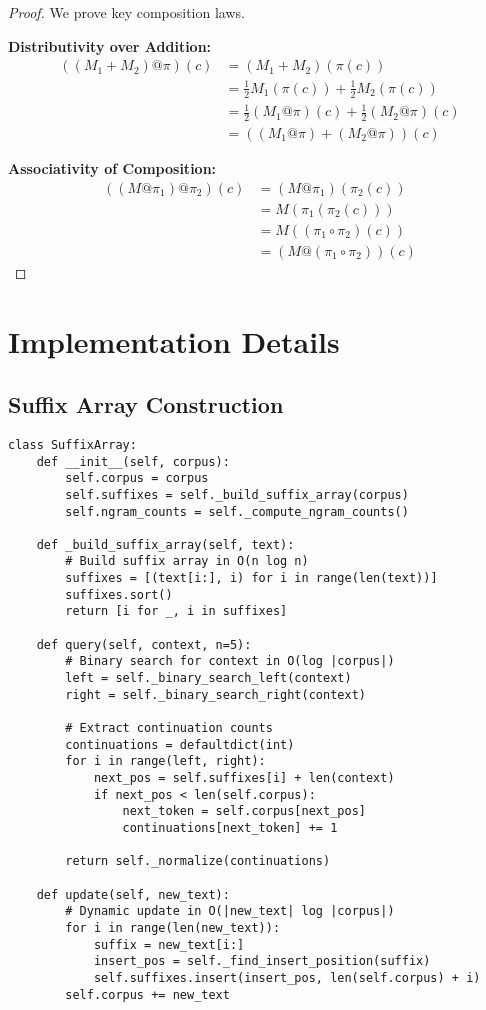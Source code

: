 \documentclass{article}
\theoremstyle{definition}
\begin{document}
\begin{proof}
We prove key composition laws.

\textbf{Distributivity over Addition:}
\begin{align}
((M_1 + M_2) @ \pi)(c) &= (M_1 + M_2)(\pi(c)) \\
&= \frac{1}{2}M_1(\pi(c)) + \frac{1}{2}M_2(\pi(c)) \\
&= \frac{1}{2}(M_1 @ \pi)(c) + \frac{1}{2}(M_2 @ \pi)(c) \\
&= ((M_1 @ \pi) + (M_2 @ \pi))(c)
\end{align}

\textbf{Associativity of Composition:}
\begin{align}
((M @ \pi_1) @ \pi_2)(c) &= (M @ \pi_1)(\pi_2(c)) \\
&= M(\pi_1(\pi_2(c))) \\
&= M((\pi_1 \circ \pi_2)(c)) \\
&= (M @ (\pi_1 \circ \pi_2))(c)
\end{align}
\end{proof}

\section{Implementation Details}

\subsection{Suffix Array Construction}

\begin{lstlisting}
class SuffixArray:
    def __init__(self, corpus):
        self.corpus = corpus
        self.suffixes = self._build_suffix_array(corpus)
        self.ngram_counts = self._compute_ngram_counts()

    def _build_suffix_array(self, text):
        # Build suffix array in O(n log n)
        suffixes = [(text[i:], i) for i in range(len(text))]
        suffixes.sort()
        return [i for _, i in suffixes]

    def query(self, context, n=5):
        # Binary search for context in O(log |corpus|)
        left = self._binary_search_left(context)
        right = self._binary_search_right(context)

        # Extract continuation counts
        continuations = defaultdict(int)
        for i in range(left, right):
            next_pos = self.suffixes[i] + len(context)
            if next_pos < len(self.corpus):
                next_token = self.corpus[next_pos]
                continuations[next_token] += 1

        return self._normalize(continuations)

    def update(self, new_text):
        # Dynamic update in O(|new_text| log |corpus|)
        for i in range(len(new_text)):
            suffix = new_text[i:]
            insert_pos = self._find_insert_position(suffix)
            self.suffixes.insert(insert_pos, len(self.corpus) + i)
        self.corpus += new_text
\end{lstlisting}
\end{document}
